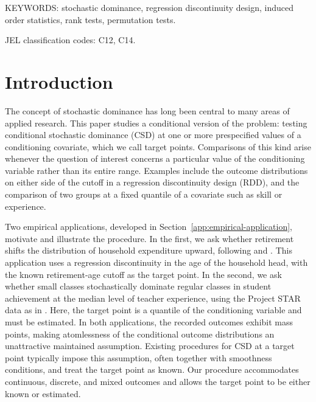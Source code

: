 \documentclass[11pt]{article}
\numberwithin{equation}{section}
\begin{document}
\noindent KEYWORDS: stochastic dominance, regression discontinuity design, induced order statistics, rank tests, permutation tests.

\noindent JEL classification codes: C12, C14.

\maketitle

\thispagestyle{empty}

\newpage 

\maketitle

\section{Introduction}\setcounter{page}{1}
The concept of stochastic dominance has long been central to many areas of applied research. This paper studies a conditional version of the problem: testing conditional stochastic dominance (CSD) at one or more prespecified values of a conditioning covariate, which we call target points. Comparisons of this kind arise whenever the question of interest concerns a particular value of the conditioning variable rather than its entire range. Examples include the outcome distributions on either side of the cutoff in a regression discontinuity design (RDD), and the comparison of two groups at a fixed quantile of a covariate such as skill or experience.

Two empirical applications, developed in Section~\ref{app:empirical-application}, motivate and illustrate the procedure. In the first, we ask whether retirement shifts the distribution of household expenditure upward, following \citet{battistin/Brugianivi/Rettore/Weber:2009} and \citet{shen/zhang:16}. This application uses a regression discontinuity in the age of the household head, with the known retirement-age cutoff as the target point. In the second, we ask whether small classes stochastically dominate regular classes in student achievement at the median level of teacher experience, using the Project STAR data as in \citet{qu/yoon:2015}. Here, the target point is a quantile of the conditioning variable and must be estimated. In both applications, the recorded outcomes exhibit mass points, making atomlessness of the conditional outcome distributions an unattractive maintained assumption. Existing procedures for CSD at a target point typically impose this assumption, often together with smoothness conditions, and treat the target point as known. Our procedure accommodates continuous, discrete, and mixed outcomes and allows the target point to be either known or estimated.
\end{document}
